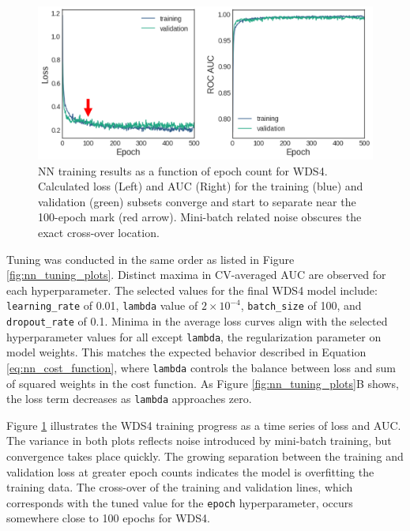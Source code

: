 \begin{figure}[htp]
\centering
\includegraphics[width=\textwidth]{templates/images/Figure-NN-Training-Loss.png}
\caption[Neural network training loss]{NN training results as a function of epoch count for WDS4. Calculated loss (Left) and AUC (Right) for the training (blue) and validation (green) subsets converge and start to separate near the 100-epoch mark (red arrow). Mini-batch related noise obscures the exact cross-over location.}
\label{fig:nn_loss_plot}
\end{figure}

Tuning was conducted in the same order as listed in Figure \ref{fig:nn_tuning_plots}. Distinct maxima in CV-averaged AUC are observed for each hyperparameter. The selected values for the final WDS4 model include: \verb|learning_rate| of 0.01, \verb|lambda| value of $2\times10^{-4}$, \verb|batch_size| of 100, and \verb|dropout_rate| of 0.1. Minima in the average loss curves align with the selected hyperparameter values for all except \verb|lambda|, the regularization parameter on model weights. This matches the expected behavior described in Equation \ref{eq:nn_cost_function}, where \verb|lambda| controls the balance between loss and sum of squared weights in the cost function. As Figure \ref{fig:nn_tuning_plots}B shows, the loss term decreases as \verb|lambda| approaches zero.

Figure \ref{fig:nn_loss_plot} illustrates the WDS4 training progress as a time series of loss and AUC. The variance in both plots reflects noise introduced by mini-batch training, but convergence takes place quickly. The growing separation between the training and validation loss at greater epoch counts indicates the model is overfitting the training data. The cross-over of the training and validation lines, which corresponds with the tuned value for the \verb|epoch| hyperparameter, occurs somewhere close to 100 epochs for WDS4.

